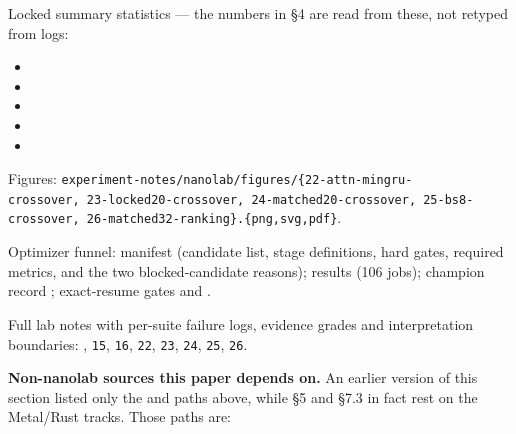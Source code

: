 Locked summary statistics --- the numbers in \S4 are read from these, not retyped from logs:

\begin{itemize}
\tightlist
\item
\item
\item
\item
\item
\end{itemize}

Figures: \texttt{experiment-notes/nanolab/figures/\{22-attn-mingru-crossover,\ 23-locked20-crossover,\ 24-matched20-crossover,\ 25-bs8-crossover,\ 26-matched32-ranking\}.\{png,svg,pdf\}}.

Optimizer funnel: manifest  (candidate list, stage definitions,
hard gates, required metrics, and the two blocked-candidate reasons); results
 (106 jobs); champion record ;
exact-resume gates  and .

Full lab notes with per-suite failure logs, evidence grades and interpretation boundaries:
, \texttt{15}, \texttt{16}, \texttt{22}, \texttt{23}, \texttt{24}, \texttt{25}, \texttt{26}.

\textbf{Non-nanolab sources this paper depends on.} An earlier version of this section listed only the
 and  paths above, while \S5 and \S7.3 in fact rest on the Metal/Rust tracks.
Those paths are:

